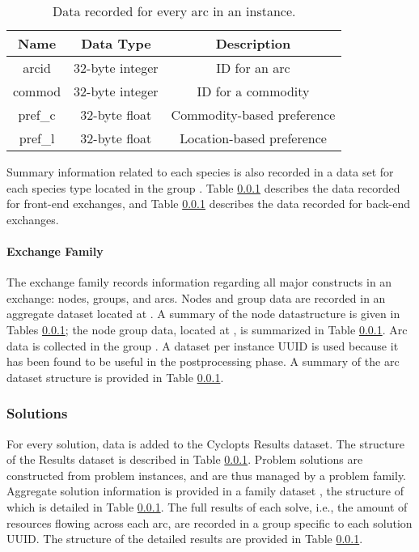 \begin{table}[]
\centering
\label{tbl:sp_inst_arc}
\caption{Data recorded for every arc in an instance.}
\begin{tabular}{|c|c|c|}
\hline
\textbf{Name} & \textbf{Data Type} & \textbf{Description}       \\ \hline
arcid         & 32-byte integer    & ID for an arc              \\ \hline
commod        & 32-byte integer    & ID for a commodity         \\ \hline
pref\_c       & 32-byte float      & Commodity-based preference \\ \hline
pref\_l       & 32-byte float      & Location-based preference  \\ \hline
\end{tabular}
\end{table}

Summary information related to each species is also recorded in a data set for
each species type located in the group . Table \ref{} describes the data recorded for front-end
exchanges, and Table \ref{} describes the data recorded for back-end exchanges.


\paragraph{Exchange Family}

The exchange family records information regarding all major constructs in an
exchange: nodes, groups, and arcs. Nodes and group data are recorded in an
aggregate dataset located at . A
summary of the node datastructure is given in Tables \ref{}; the node group
data, located at , is summarized
in Table \ref{}. Arc data is collected in the group
. A dataset per instance UUID is
used because it has been found to be useful in the postprocessing phase. A
summary of the arc dataset structure is provided in Table \ref{}.


\subsubsection{Solutions}

For every solution, data is added to the Cyclopts Results dataset. The structure
of the Results dataset is described in Table \ref{}. Problem solutions are
constructed from problem instances, and are thus managed by a problem
family. Aggregate solution information is provided in a family dataset
, the structure of
which is detailed in Table \ref{}. The full results of each solve, i.e., the
amount of resources flowing across each arc, are recorded in a group specific to
each solution UUID. The structure of the detailed results are provided in Table
\ref{}.

